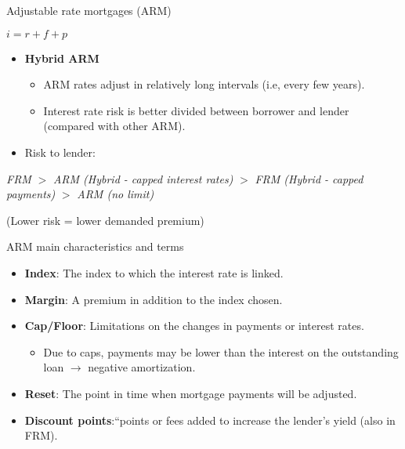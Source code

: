 \documentclass[ignorenonframetext,]{beamer}
\providecommand{\tightlist}{%
\setlength{\itemsep}{0pt}\setlength{\parskip}{0pt}}
\begin{document}
\begin{frame}{Adjustable rate mortgages (ARM)}

\(i = r + f + p\)

\begin{itemize}
\tightlist
\item
  \textbf{Hybrid ARM}

  \begin{itemize}
  \tightlist
  \item
    ARM rates adjust in relatively long intervals (i.e, every few
    years).
  \item
    Interest rate risk is better divided between borrower and lender
    (compared with other ARM).
  \end{itemize}
\item
  Risk to lender:
\end{itemize}

\small

\emph{FRM} \(>\) \emph{ARM (Hybrid - capped interest rates)} \(>\)
\emph{FRM (Hybrid - capped payments)} \(>\) \emph{ARM (no limit)}

\normalsize

(Lower risk = lower demanded premium)

\end{frame}

\begin{frame}{ARM main characteristics and terms}

\begin{itemize}
\tightlist
\item
  \textbf{Index}: The index to which the interest rate is linked.
\item
  \textbf{Margin}: A premium in addition to the index chosen.
\item
  \textbf{Cap/Floor}: Limitations on the changes in payments or interest
  rates.

  \begin{itemize}
  \tightlist
  \item
    Due to caps, payments may be lower than the interest on the
    outstanding loan \(\rightarrow\) negative amortization.
  \end{itemize}
\item
  \textbf{Reset}: The point in time when mortgage payments will be
  adjusted.
\item
  \textbf{Discount points}:``points or fees added to increase the
  lender's yield (also in FRM).
\end{itemize}

\end{frame}
\end{document}
